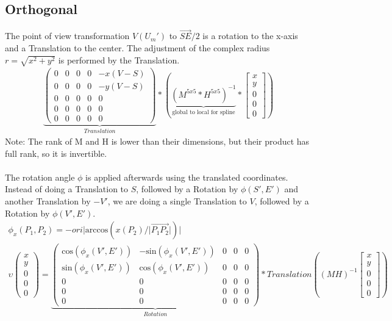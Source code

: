 \documentclass{report}
\begin{document}
\subsection{Orthogonal}
The point of view transformation $V(U_{m}')$ to $\overrightarrow{SE}/2$ is a rotation to the x-axis and a Translation to the center. The adjustment of the complex radius $r=\sqrt{x^2+y^2}$ is performed by the Translation.
\begin{align}
\underbrace{
\begin{pmatrix}
0 & 0 & 0 & 0 & -x(V-S) \\
0 & 0 & 0 & 0 & -y(V-S) \\
0 & 0 & 0 & 0 & 0 \\
0 & 0 & 0 & 0 & 0 \\
0 & 0 & 0 & 0 & 0
\end{pmatrix}
}_{Translation}
*(
\underbrace{
(M^{5x5} * H^{5x5})^{-1}
}_{\text{global to local for spline}}
*\begin{bmatrix} x \\ y \\ 0 \\ 0 \\ 0 \end{bmatrix})
\end{align}
Note: The rank of M and H is lower than their dimensions, but their product has full rank, so it is invertible.\\\\
The rotation angle $\phi$ is applied afterwards using the translated coordinates. Instead of doing a Translation to $S$, followed by a Rotation by $\phi(S',E')$ and another Translation by $-V'$, we are doing a single Translation to $V$, followed by a Rotation by $\phi(V',E')$.
\begin{align}
\phi_{x}(P_{1},P_{2}) = -ori\lvert \mathrm{arccos}(x(P_{2})/\lvert \overrightarrow{P_{1}P_{2}}\rvert)\rvert\\
\upsilon
\begin{pmatrix}x \\ y \\ 0 \\ 0 \\ 0\end{pmatrix}
=
\underbrace{
\begin{pmatrix}
\mathrm{cos}(\phi_{x}(V',E')) & -\mathrm{sin}(\phi_{x}(V',E')) & 0 & 0 & 0 \\
\mathrm{sin}(\phi_{x}(V',E')) & \mathrm{cos}(\phi_{x}(V',E')) & 0 & 0 & 0 \\
0 & 0 & 0 & 0 & 0 \\
0 & 0 & 0 & 0 & 0 \\
0 & 0 & 0 & 0 & 0
\end{pmatrix}
}_{Rotation}*
Translation((MH)^{-1}\begin{bmatrix} x \\ y \\ 0 \\ 0 \\ 0 \end{bmatrix})
\end{align}
\end{document}
